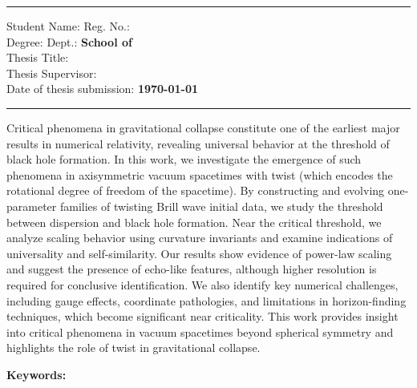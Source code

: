 \begin{flushleft} %
    \setlength{\parskip}{0pt}
    { \par}
    \medskip
    \vspace{6pt}
    \hrule \vspace{0.4cm}
		  Student Name:	 \textbf{\ThesisAuthor}	\hfill Reg. No.: \textbf{\RegNumber} \\
		Degree:  \textbf{\DegreeDisplay} \hfill Dept.:  \textbf{School of \Department} \: \textbf{\ThesisTitle}\\
		Thesis Supervisor:  \textbf{\ProjectSupervisor}\\
		Date of thesis submission: \textbf{{ \today}\\[0.4cm] }
	\hrule \vspace{1.5cm} 
\end{flushleft}
\noindent
Critical phenomena in gravitational collapse constitute one of the earliest major results in numerical relativity, revealing universal behavior at the threshold of black hole formation. In this work, we investigate the emergence of such phenomena in axisymmetric vacuum spacetimes with twist (which encodes the rotational degree of freedom of the spacetime). By constructing and evolving one-parameter families of twisting Brill wave initial data, we study the threshold between dispersion and black hole formation. Near the critical threshold, we analyze scaling behavior using curvature invariants and examine indications of universality and self-similarity. Our results show evidence of power-law scaling and suggest the presence of echo-like features, although higher resolution is required for conclusive identification. We also identify key numerical challenges, including gauge effects, coordinate pathologies, and limitations in horizon-finding techniques, which become significant near criticality. This work provides insight into critical phenomena in vacuum spacetimes beyond spherical symmetry and highlights the role of twist in gravitational collapse.
\vspace{4cm}

{\large \textbf{Keywords: }}\par{\Large \ThesisKeywords}

\cleardoublepage
